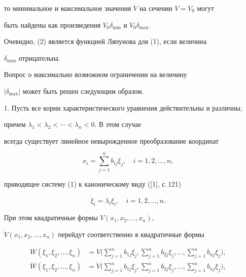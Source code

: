 \begin{pf}
то минимальное и максимальное значения $\Dot V$ на сечении $V=V_{0}$ могут


быть найдены как произведения $V_{0}\delta_{\min}$ и $V_{0}\delta_{\max}$.





Очевидно, (2) является функцией Ляпунова для (1), если величина 


$\delta_{\max}$ отрицательна.


Вопрос о максимально возможном ограничении на величину


$|\delta_{\max}|$ может быть решен следующим образом.





1. Пусть все корни характеристического уравнения действительны и различны,


причем $\lambda_{1}<\lambda_{2}<\dotsb <\lambda_{n}<0$. В этом случае


всегда существует линейное невырожденное преобразование координат


$$


x_{i}=\sum_{j=1}^{n} b_{ij}\xi_{j},\quad i=1,2,\dotsc,n,


$$


приводящее систему (1) к каноническому виду ([1], с.\,121)


\begin{equation}


\Dot \xi_{i}=\lambda_{i}\xi_{i},\quad i=1,2,\dotsc,n.


\end{equation}


При этом квадратичные формы $V(x_{1},x_{2},\dotsc,x_{n})$,


$\Dot V(x_{1},x_{2},\dotsc,x_{n})$ перейдут соответственно в квадратичные формы


\begin{align*}


W(\xi_{1},\xi_{2},\dotsc,\xi_{n})&=V\bigg(\sum_{j=1}^{n} b_{1j}\xi_{j},


\sum_{j=1}^{n} b_{2j}\xi_{j},\dotsc,\sum_{j=1}^{n} b_{nj}\xi_{j}\bigg),\\


%


\Dot W(\xi_{1},\xi_{2},\dotsc,\xi_{n})&=\Dot V


\bigg(\sum_{j=1}^{n} b_{1j}\xi_{j},\sum_{j=1}^{n} b_{2j}\xi_{j},\dotsc,


\sum_{j=1}^{n} b_{nj}\xi_{j}\bigg),



\end{align*}
\end{pf}
